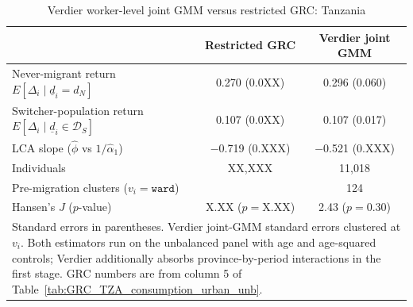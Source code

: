 \begin{table}[ht]
\centering
\small
\caption{Verdier worker-level joint GMM versus restricted GRC: Tanzania}
\label{tab:verdier_robust_joint_gmm_TZA}
\begin{tabular}{lcc}
\hline\hline
 & Restricted GRC & Verdier joint GMM \\
\hline
Never-migrant return $E[\Delta_i \mid \underline d_i = d_N]$ & 0.270 (0.0XX) & 0.296 (0.060) \\
Switcher-population return $E[\Delta_i \mid \underline d_i \in \mathcal D_S]$ & 0.107 (0.0XX) & 0.107 (0.017) \\
LCA slope ($\hat\phi$ vs $1/\hat\alpha_1$) & $-$0.719 (0.XXX) & $-$0.521 (0.XXX) \\
\hline
Individuals & XX,XXX & 11,018 \\
Pre-migration clusters ($v_i = \texttt{ward}$) & & 124 \\
Hansen's $J$ ($p$-value) & X.XX ($p = $X.XX) & 2.43 ($p = $0.30) \\
\hline\hline
\multicolumn{3}{p{0.92\linewidth}}{\footnotesize Standard errors in parentheses. Verdier joint-GMM standard errors clustered at $v_i$. Both estimators run on the unbalanced panel with age and age-squared controls; Verdier additionally absorbs province-by-period interactions in the first stage. GRC numbers are from column 5 of Table~\ref{tab:GRC_TZA_consumption_urban_unb}.} \\
\end{tabular}
\end{table}
